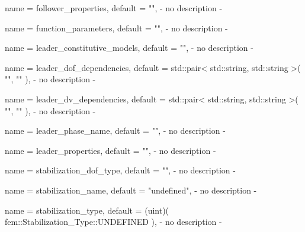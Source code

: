 \begin{parameter}{
    name    = {follower_properties},
    default = {""},
}
- no description -
\end{parameter}

\begin{parameter}{
    name    = {function_parameters},
    default = {""},
}
- no description -
\end{parameter}

\begin{parameter}{
    name    = {leader_constitutive_models},
    default = {""},
}
- no description -
\end{parameter}

\begin{parameter}{
    name    = {leader_dof_dependencies},
    default = {std::pair< std::string, std::string >( "", "" )},
}
- no description -
\end{parameter}

\begin{parameter}{
    name    = {leader_dv_dependencies},
    default = {std::pair< std::string, std::string >( "", "" )},
}
- no description -
\end{parameter}

\begin{parameter}{
    name    = {leader_phase_name},
    default = {""},
}
- no description -
\end{parameter}

\begin{parameter}{
    name    = {leader_properties},
    default = {""},
}
- no description -
\end{parameter}

\begin{parameter}{
    name    = {stabilization_dof_type},
    default = {""},
}
- no description -
\end{parameter}

\begin{parameter}{
    name    = {stabilization_name},
    default = {"undefined"},
}
- no description -
\end{parameter}

\begin{parameter}{
    name    = {stabilization_type},
    default = {(uint)( fem::Stabilization_Type::UNDEFINED )},
}
- no description -
\end{parameter}


